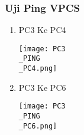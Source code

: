 \documentclass[12pt, a4paper]{article}
\begin{document}
\subsubsection*{Uji Ping VPCS}
\begin{enumerate}
  \item PC3 Ke PC4

      \texttt{[image: PC3\\\_PING\\\_PC4.png]}

  \item PC3 Ke PC6

      \texttt{[image: PC3\\\_PING\\\_PC6.png]}

\end{enumerate}
\end{document}
